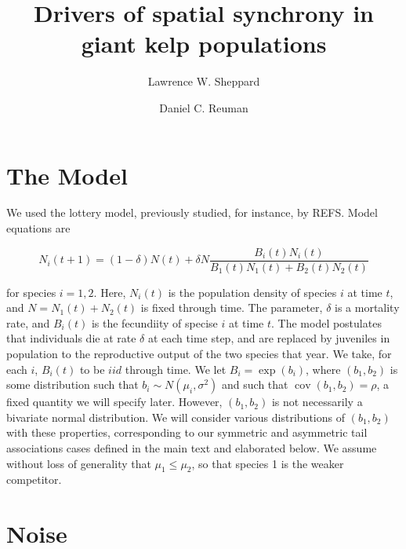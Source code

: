 \documentclass[letterpaper,11pt]{article}
\title{Drivers of spatial synchrony in giant kelp populations}
\date{}
\author{Lawrence W. Sheppard}
\author{Daniel C. Reuman}
\DeclareMathOperator{\CovX}{cov}
\begin{document}



\maketitle


\section{The Model}

We used the lottery model, previously studied, for instance, by REFS. Model equations are

\begin{equation}
N_i(t+1)=(1-\delta)N(t)+\delta N \frac{B_i(t)N_i(t)}{B_1(t)N_1(t)+B_2(t)N_2(t)}  \label{model_eq}
\end{equation}

\noindent for species $i=1,2$. 
Here, $N_i(t)$ is the population density of species $i$ at time $t$, and $N = N_1(t)+N_2(t)$ is fixed through time. 
The parameter, $\delta$ is a mortality rate, and $B_i(t)$ is the fecundiity of specise $i$ at time $t$. 
The model postulates that individuals die at rate $\delta$ at each time step, and are replaced by juveniles in population to the reproductive output of the two species that year.
We take, for each $i$, $B_i(t)$ to be $iid$ through time. 
We let $B_i = \exp(b_i)$, where $\left(b_1, b_2\right)$ is some distribution such that $b_i \sim N\left(\mu_i, \sigma^2\right)$ and such that $\CovX(b_1, b_2) = \rho$, a fixed quantity we will specify later.
However, $\left(b_1, b_2\right)$ is not necessarily a bivariate normal distribution.
We will consider various distributions of $\left(b_1, b_2\right)$ with these properties, corresponding to our symmetric and asymmetric tail associations cases defined in the main text and elaborated below.
We assume without loss of generality that $\mu_1 \leq \mu_2$, so that species 1 is the weaker competitor. 

\section{Noise} \label{sect:noise}
\end{document}
